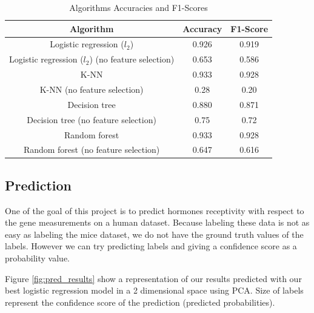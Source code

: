 \documentclass[10pt,conference,compsocconf]{IEEEtran}
\begin{document}
\begin{table}[H]
    \centering
    \begin{tabular}{|c|c|c|}
    \hline
    \textbf{Algorithm}      &\textbf{Accuracy}&\textbf{F1-Score} \\\hline
    Logistic regression ($l_{2}$)    &      0.926 & 0.919      \\\hline
    Logistic regression ($l_{2}$) (no feature selection)   &      0.653 & 0.586      \\\hline
    K-NN                        &      0.933    &  0.928     \\\hline
    K-NN (no feature selection) &      0.28     &  0.20     \\\hline
    Decision tree               &      0.880    &  0.871   \\\hline
    Decision tree  (no feature selection)&      0.75 &    0.72   \\\hline
    Random forest               &     0.933   &  0.928    \\\hline
    Random forest  (no feature selection)&     0.647  &  0.616    \\\hline
    
    \end{tabular}
    \caption{Algorithms Accuracies and F1-Scores}
    \label{tab:result_acc}
\end{table}
\vspace{-1cm}

\subsection{Prediction}

One of the goal of this project is to predict hormones receptivity with respect to the gene measurements on a human dataset. Because labeling these data is not as easy as labeling the mice dataset, we do not have the ground truth values of the labels. However we can try predicting labels and giving a confidence score as a probability value.

Figure \ref{fig:pred_results} show a representation of our results predicted with our best logistic regression model in a 2 dimensional space using PCA. Size of labels represent the confidence score of the prediction (predicted probabilities).
\end{document}
